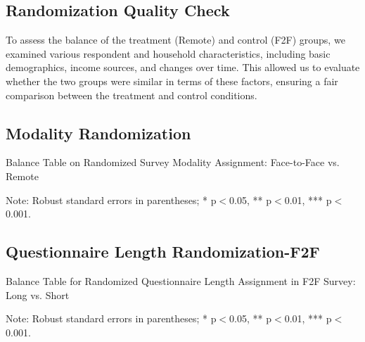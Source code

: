 \documentclass[11pt,harvard]{article}
\begin{document}
\subsection{Randomization Quality Check}
	
To assess the balance of the treatment (Remote) and control (F2F) groups, we examined various respondent and household characteristics, including basic demographics, income sources, and changes over time. This allowed us to evaluate whether the two groups were similar in terms of these factors, ensuring a fair comparison between the treatment and control conditions.
	
\subsection{Modality Randomization}


	\begin{table}[htbp]
		\centering
		\begin{adjustbox}{max width=\textwidth}
			\begin{threeparttable}
				\caption{Balance Table on Randomized Survey Modality Assignment: Face-to-Face vs. Remote}
				\scriptsize
				 
				\label{tab:CAR_Listing_Demo_Balance_Modality}
				\begin{tablenotes}
					\item Note: Robust standard errors in parentheses; * p$<$0.05, ** p$<$0.01, *** p$<$0.001. 
				\end{tablenotes}
			\end{threeparttable}
		\end{adjustbox}
	\end{table}
	
	\pagebreak
	
	
	
\subsection{Questionnaire Length Randomization-F2F}
	
	\begin{table}[htbp]
		\centering
		\begin{adjustbox}{max width=\textwidth}
			\begin{threeparttable}
				\caption{Balance Table for Randomized Questionnaire Length Assignment in F2F Survey: Long vs. Short}
				\scriptsize
				 
				\label{tab:CAR_Listing_Demo_Balance_F2F_Length}
				\begin{tablenotes}
					\item Note: Robust standard errors in parentheses; * p$<$0.05, ** p$<$0.01, *** p$<$0.001.
				\end{tablenotes}
			\end{threeparttable}
		\end{adjustbox}
	\end{table}
	
\end{document}
